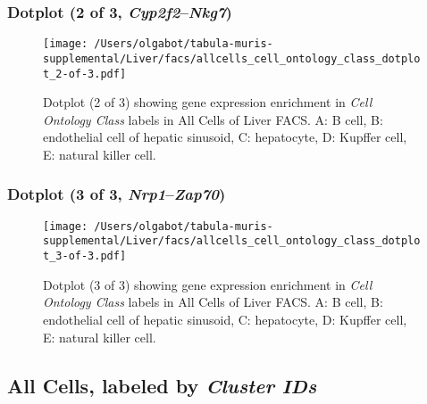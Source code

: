 \clearpage

\subsubsection{Dotplot (2 of 3, \emph{Cyp2f2}--\emph{Nkg7})}
\begin{figure}[h]
\centering
\texttt{[image: /Users/olgabot/tabula-muris-supplemental/Liver/facs/allcells\_cell\_ontology\_class\_dotplot\_2-of-3.pdf]}

\caption{ Dotplot (2 of 3)  showing gene expression enrichment in \emph{Cell Ontology Class} labels in All Cells of Liver FACS. A: B cell, B: endothelial cell of hepatic sinusoid, C: hepatocyte, D: Kupffer cell, E: natural killer cell.}
\end{figure}


\clearpage

\subsubsection{Dotplot (3 of 3, \emph{Nrp1}--\emph{Zap70})}
\begin{figure}[h]
\centering
\texttt{[image: /Users/olgabot/tabula-muris-supplemental/Liver/facs/allcells\_cell\_ontology\_class\_dotplot\_3-of-3.pdf]}

\caption{ Dotplot (3 of 3)  showing gene expression enrichment in \emph{Cell Ontology Class} labels in All Cells of Liver FACS. A: B cell, B: endothelial cell of hepatic sinusoid, C: hepatocyte, D: Kupffer cell, E: natural killer cell.}
\end{figure}


\clearpage

\subsection{All Cells, labeled by \emph{Cluster IDs}}
